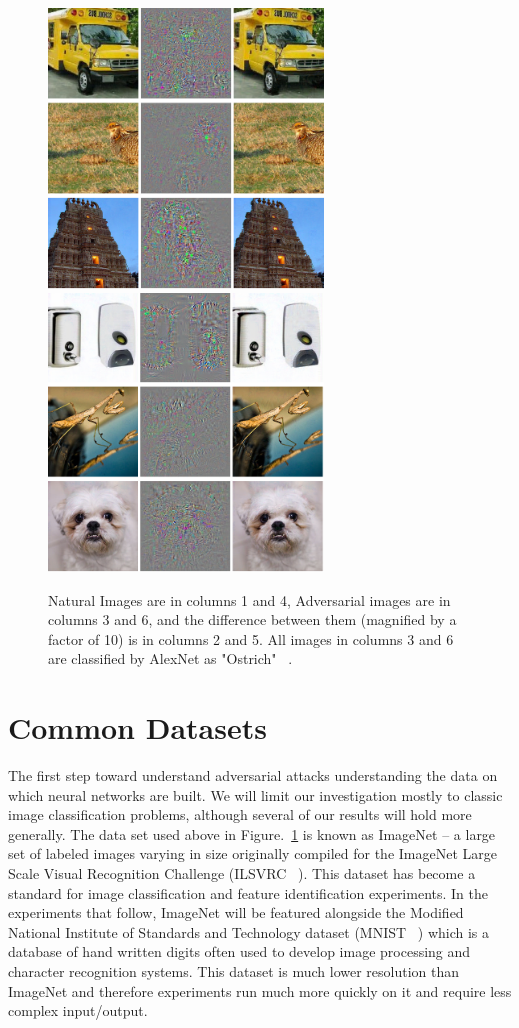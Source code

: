 \begin{figure}[ht]
    \centering
\includegraphics[width=7.3cm]{c1_figures/negative1.png}\includegraphics[width=7.3cm]{c1_figures/negative2.png}
    \caption{Natural Images are in columns 1 and 4, Adversarial images are in columns 3 and 6, and the difference between them (magnified by a factor of 10) is in columns 2 and 5. All images in columns 3 and 6 are classified by AlexNet as "Ostrich" ~\citep{szegedy2013}.}
    \label{fig:szegedy}
\end{figure}

\section{Common Datasets}

The first step toward understand adversarial attacks understanding
the data on which neural networks are built. We will limit our
investigation mostly to classic image classification problems,
although several of our results will hold more generally. The data set
used above in Figure.~\ref{fig:szegedy} is known as ImageNet -- a
large set of labeled images varying in size originally compiled for
the ImageNet Large Scale Visual Recognition Challenge (ILSVRC
~\citet{ILSVRC15}). This dataset has become a
standard for image classification and feature identification
experiments. In the experiments that follow, ImageNet will be featured
alongside the Modified National Institute of Standards and Technology
dataset (MNIST ~\citet{MNIST}) which is a database of hand written
digits often used to develop image processing and character
recognition systems. This dataset is much lower resolution than
ImageNet and therefore experiments run much more quickly on it and
require less complex input/output.  

